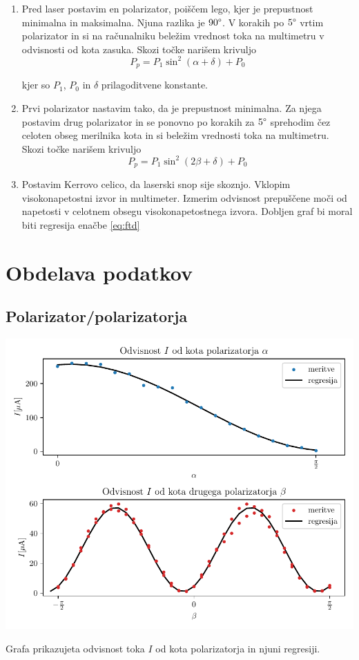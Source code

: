 \documentclass[12pt]{report}
\begin{document}
\begin{enumerate}
  \item Pred laser postavim en polarizator, poiščem lego, kjer je prepustnost minimalna in maksimalna. Njuna razlika je $90\degree$. V korakih po $5\degree$ vrtim polarizator in si na računalniku beležim vrednost toka na multimetru v odvisnosti od kota zasuka. Skozi točke narišem krivuljo 
  \begin{equation}
    P_p = P_1 \sin^2(\alpha + \delta) + P_0
  \end{equation}

  kjer so $P_1$, $P_0$ in $\delta$ prilagoditvene konstante. 
  \item Prvi polarizator nastavim tako, da je prepustnost minimalna. Za njega postavim drug polarizator in se ponovno po korakih za $5\degree$ sprehodim čez celoten obseg merilnika kota in si beležim vrednosti toka na multimetru. Skozi točke narišem krivuljo 
  \begin{equation}
    P_p = P_1\sin^2(2\beta + \delta) + P_0
  \end{equation}
  \item Postavim Kerrovo celico, da laserski snop sije skoznjo. Vklopim visokonapetostni izvor in multimeter. Izmerim odvisnost prepuščene moči od napetosti v celotnem obsegu visokonapetostnega izvora. Dobljen graf bi moral biti regresija enačbe \ref{eq:ftd}
\end{enumerate}

\endgroup

\chapter*{Obdelava podatkov}

\section*{Polarizator/polarizatorja}

\begin{slika}[H]
  \centering
  \includegraphics{angleofthedangle}
  \caption{\small Grafa prikazujeta odvisnost toka $I$ od kota polarizatorja in njuni regresiji.}
\end{slika}
\end{document}

